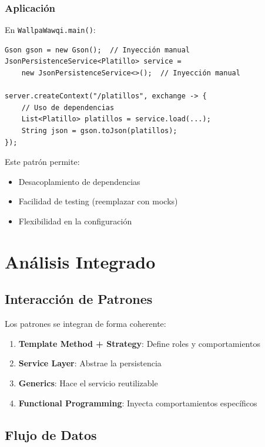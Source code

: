 \documentclass[12pt, a4paper]{report}
\begin{document}
\subsection{Aplicación}

En \texttt{WallpaWawqi.main()}:

\begin{verbatim}
Gson gson = new Gson();  // Inyección manual
JsonPersistenceService<Platillo> service =
    new JsonPersistenceService<>();  // Inyección manual

server.createContext("/platillos", exchange -> {
    // Uso de dependencias
    List<Platillo> platillos = service.load(...);
    String json = gson.toJson(platillos);
});
\end{verbatim}

Este patrón permite:
\begin{itemize}
    \item Desacoplamiento de dependencias
    \item Facilidad de testing (reemplazar con mocks)
    \item Flexibilidad en la configuración
\end{itemize}

\newpage

\chapter{Análisis Integrado}

\section{Interacción de Patrones}

Los patrones se integran de forma coherente:

\begin{enumerate}
    \item \textbf{Template Method + Strategy}: Define roles y comportamientos
    \item \textbf{Service Layer}: Abstrae la persistencia
    \item \textbf{Generics}: Hace el servicio reutilizable
    \item \textbf{Functional Programming}: Inyecta comportamientos específicos
\end{enumerate}

\section{Flujo de Datos}
\end{document}
